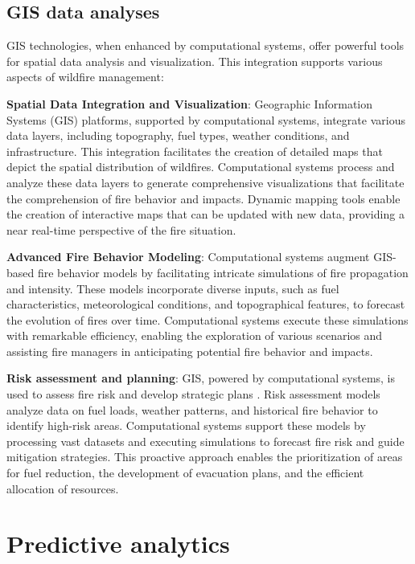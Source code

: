\documentclass[
  12 pt,
]{Nemilov}
\begin{document}
\subsection{GIS data analyses}\label{gis-data-analyses}

GIS technologies, when enhanced by computational systems, offer powerful tools for spatial data analysis and visualization. This integration supports various aspects of wildfire management:

\textbf{Spatial Data Integration and Visualization}: Geographic Information Systems (GIS) platforms, supported by computational systems, integrate various data layers, including topography, fuel types, weather conditions, and infrastructure. This integration facilitates the creation of detailed maps that depict the spatial distribution of wildfires. Computational systems process and analyze these data layers to generate comprehensive visualizations that facilitate the comprehension of fire behavior and impacts. Dynamic mapping tools enable the creation of interactive maps that can be updated with new data, providing a near real-time perspective of the fire situation.

\textbf{Advanced Fire Behavior Modeling}: Computational systems augment GIS-based fire behavior models by facilitating intricate simulations of fire propagation and intensity. These models incorporate diverse inputs, such as fuel characteristics, meteorological conditions, and topographical features, to forecast the evolution of fires over time. Computational systems execute these simulations with remarkable efficiency, enabling the exploration of various scenarios and assisting fire managers in anticipating potential fire behavior and impacts.

\textbf{Risk assessment and planning}: GIS, powered by computational systems, is used to assess fire risk and develop strategic plans \citep{ankur2018generation}. Risk assessment models analyze data on fuel loads, weather patterns, and historical fire behavior to identify high-risk areas. Computational systems support these models by processing vast datasets and executing simulations to forecast fire risk and guide mitigation strategies. This proactive approach enables the prioritization of areas for fuel reduction, the development of evacuation plans, and the efficient allocation of resources.

\section{Predictive analytics}\label{predictive-analytics}
\end{document}
